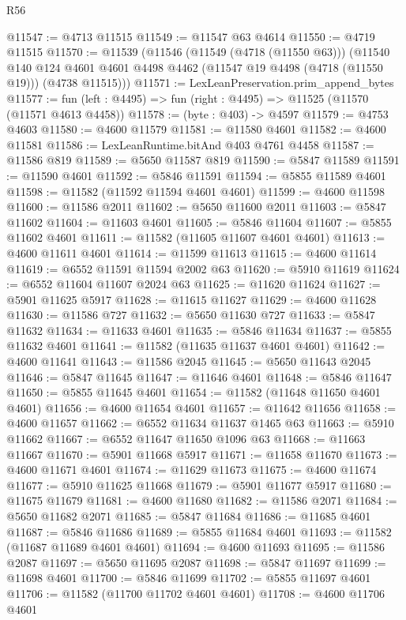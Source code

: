 \begin{lexlean}{R56}
\begin{coremodule}
@11547 := @4713 @11515
@11549 := @11547 @63 @4614
@11550 := @4719 @11515
@11570 := @11539
    (@11546
      (@11549 (@4718 (@11550 @63)))
      (@11540
        @140
        @124
        @4601
        @4601
        @4498
        @4462
        (@11547 @19 @4498 (@4718 (@11550 @19)))
        (@4738 @11515)))
@11571 := LexLeanPreservation.prim_append_bytes
@11577 := fun (left : @4495) => fun (right : @4495) => @11525 (@11570 (@11571 @4613 @4458))
@11578 := (byte : @403) -> @4597
@11579 := @4753 @4603
@11580 := @4600 @11579
@11581 := @11580 @4601
@11582 := @4600 @11581
@11586 := LexLeanRuntime.bitAnd @403 @4761 @4458
@11587 := @11586 @819
@11589 := @5650 @11587 @819
@11590 := @5847 @11589
@11591 := @11590 @4601
@11592 := @5846 @11591
@11594 := @5855 @11589 @4601
@11598 := @11582 (@11592 @11594 @4601 @4601)
@11599 := @4600 @11598
@11600 := @11586 @2011
@11602 := @5650 @11600 @2011
@11603 := @5847 @11602
@11604 := @11603 @4601
@11605 := @5846 @11604
@11607 := @5855 @11602 @4601
@11611 := @11582 (@11605 @11607 @4601 @4601)
@11613 := @4600 @11611 @4601
@11614 := @11599 @11613
@11615 := @4600 @11614
@11619 := @6552 @11591 @11594 @2002 @63
@11620 := @5910 @11619
@11624 := @6552 @11604 @11607 @2024 @63
@11625 := @11620 @11624
@11627 := @5901 @11625 @5917
@11628 := @11615 @11627
@11629 := @4600 @11628
@11630 := @11586 @727
@11632 := @5650 @11630 @727
@11633 := @5847 @11632
@11634 := @11633 @4601
@11635 := @5846 @11634
@11637 := @5855 @11632 @4601
@11641 := @11582 (@11635 @11637 @4601 @4601)
@11642 := @4600 @11641
@11643 := @11586 @2045
@11645 := @5650 @11643 @2045
@11646 := @5847 @11645
@11647 := @11646 @4601
@11648 := @5846 @11647
@11650 := @5855 @11645 @4601
@11654 := @11582 (@11648 @11650 @4601 @4601)
@11656 := @4600 @11654 @4601
@11657 := @11642 @11656
@11658 := @4600 @11657
@11662 := @6552 @11634 @11637 @1465 @63
@11663 := @5910 @11662
@11667 := @6552 @11647 @11650 @1096 @63
@11668 := @11663 @11667
@11670 := @5901 @11668 @5917
@11671 := @11658 @11670
@11673 := @4600 @11671 @4601
@11674 := @11629 @11673
@11675 := @4600 @11674
@11677 := @5910 @11625 @11668
@11679 := @5901 @11677 @5917
@11680 := @11675 @11679
@11681 := @4600 @11680
@11682 := @11586 @2071
@11684 := @5650 @11682 @2071
@11685 := @5847 @11684
@11686 := @11685 @4601
@11687 := @5846 @11686
@11689 := @5855 @11684 @4601
@11693 := @11582 (@11687 @11689 @4601 @4601)
@11694 := @4600 @11693
@11695 := @11586 @2087
@11697 := @5650 @11695 @2087
@11698 := @5847 @11697
@11699 := @11698 @4601
@11700 := @5846 @11699
@11702 := @5855 @11697 @4601
@11706 := @11582 (@11700 @11702 @4601 @4601)
@11708 := @4600 @11706 @4601

\end{coremodule}
\end{lexlean}
